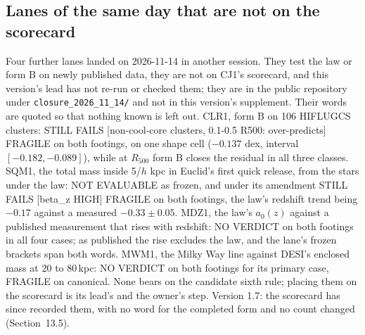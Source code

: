 \documentclass[10pt]{article}
\begin{document}
\subsection{Lanes of the same day that are not on the scorecard}
Four further lanes landed on 2026-11-14 in another session. They test the law or form B on newly published data, they are not on CJ1's scorecard, and this version's lead has not re-run or checked them; they are in the public repository under \texttt{closure\_2026\_11\_14/} and not in this version's supplement. Their words are quoted so that nothing known is left out. CLR1, form B on 106 HIFLUGCS clusters: STILL FAILS [non-cool-core clusters, 0.1-0.5 R500: over-predicts] FRAGILE on both footings, on one shape cell ($-0.137$ dex, interval $[-0.182,-0.089]$), while at $R_{500}$ form B closes the residual in all three classes. SQM1, the total mass inside 5/$h$ kpc in Euclid's first quick release, from the stars under the law: NOT EVALUABLE as frozen, and under its amendment STILL FAILS [beta\_z HIGH] FRAGILE on both footings, the law's redshift trend being $-0.17$ against a measured $-0.33\pm0.05$. MDZ1, the law's $a_0(z)$ against a published measurement that rises with redshift: NO VERDICT on both footings in all four cases; as published the rise excludes the law, and the lane's frozen brackets span both words. MWM1, the Milky Way line against DESI's enclosed mass at 20 to 80\,kpc: NO VERDICT on both footings for its primary case, FRAGILE on canonical. None bears on the candidate sixth rule; placing them on the scorecard is its lead's and the owner's step. Version 1.7: the scorecard has since recorded them, with no word for the completed form and no count changed (Section~13.5).
\end{document}
